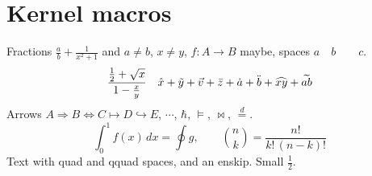 \documentclass{article}
\begin{document}
\section{Kernel macros}
Fractions $\frac{a}{b} + \frac{1}{x^2+1}$ and $a \neq b$, $x \ne y$, $f\colon A\to B$ maybe, spaces $a\quad b\qquad c$.
\[ \frac{\frac{1}{2} + \sqrtsign{x}}{1 - \frac{x}{y}} \quad \hat{x} + \tilde{y} + \vec{v} + \bar{z} + \dot{a} + \ddot{b} + \widehat{xy} + \widetilde{ab} \]
Arrows $A \Longrightarrow B \Longleftrightarrow C \mapsto D \hookrightarrow E$, $\cdots$, $\hbar$, $\models$, $\bowtie$, $\stackrel{d}{=}$.
\[ \int_0^1 f(x)\,dx = \oint g, \qquad {n \choose k} = \frac{n!}{k!\,(n-k)!} \]
Text with \quad quad and \qquad qquad spaces, and an \enskip enskip.
{\small Small $\frac{1}{2}$.}
\end{document}

